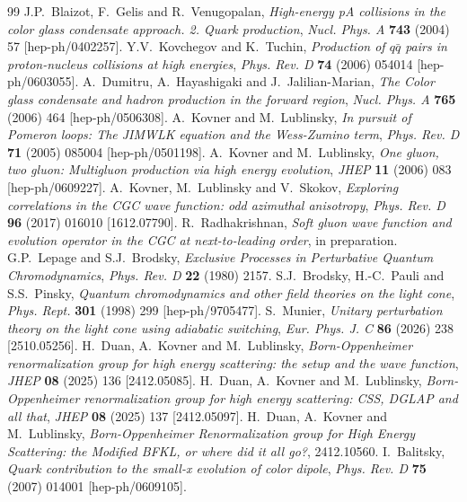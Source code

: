 \documentclass[11pt,a4paper]{article}
\numberwithin{equation}{section}
\begin{document}
\begin{thebibliography}{99}
 J.P.~Blaizot, F.~Gelis and R.~Venugopalan, \emph{High-energy pA collisions in the color glass condensate approach. 2. Quark production}, \emph{Nucl. Phys. A} \textbf{743} (2004) 57 [hep-ph/0402257].
 Y.V.~Kovchegov and K.~Tuchin, \emph{Production of $q\bar q$ pairs in proton-nucleus collisions at high energies}, \emph{Phys. Rev. D} \textbf{74} (2006) 054014 [hep-ph/0603055].
 A.~Dumitru, A.~Hayashigaki and J.~Jalilian-Marian, \emph{The Color glass condensate and hadron production in the forward region}, \emph{Nucl. Phys. A} \textbf{765} (2006) 464 [hep-ph/0506308].
 A.~Kovner and M.~Lublinsky, \emph{In pursuit of Pomeron loops: The JIMWLK equation and the Wess-Zumino term}, \emph{Phys. Rev. D} \textbf{71} (2005) 085004 [hep-ph/0501198].
 A.~Kovner and M.~Lublinsky, \emph{One gluon, two gluon: Multigluon production via high energy evolution}, \emph{JHEP} \textbf{11} (2006) 083 [hep-ph/0609227].
 A.~Kovner, M.~Lublinsky and V.~Skokov, \emph{Exploring correlations in the CGC wave function: odd azimuthal anisotropy}, \emph{Phys. Rev. D} \textbf{96} (2017) 016010 [1612.07790].
 R.~Radhakrishnan, \emph{Soft gluon wave function and evolution operator in the CGC at next-to-leading order}, in preparation.
 G.P.~Lepage and S.J.~Brodsky, \emph{Exclusive Processes in Perturbative Quantum Chromodynamics}, \emph{Phys. Rev. D} \textbf{22} (1980) 2157.
 S.J.~Brodsky, H.-C.~Pauli and S.S.~Pinsky, \emph{Quantum chromodynamics and other field theories on the light cone}, \emph{Phys. Rept.} \textbf{301} (1998) 299 [hep-ph/9705477].
 S.~Munier, \emph{Unitary perturbation theory on the light cone using adiabatic switching}, \emph{Eur. Phys. J. C} \textbf{86} (2026) 238 [2510.05256].
 H.~Duan, A.~Kovner and M.~Lublinsky, \emph{Born-Oppenheimer renormalization group for high energy scattering: the setup and the wave function}, \emph{JHEP} \textbf{08} (2025) 136 [2412.05085].
 H.~Duan, A.~Kovner and M.~Lublinsky, \emph{Born-Oppenheimer renormalization group for high energy scattering: CSS, DGLAP and all that}, \emph{JHEP} \textbf{08} (2025) 137 [2412.05097].
 H.~Duan, A.~Kovner and M.~Lublinsky, \emph{Born-Oppenheimer Renormalization group for High Energy Scattering: the Modified BFKL, or where did it all go?}, 2412.10560.
 I.~Balitsky, \emph{Quark contribution to the small-x evolution of color dipole}, \emph{Phys. Rev. D} \textbf{75} (2007) 014001 [hep-ph/0609105].

\end{thebibliography}
\end{document}

